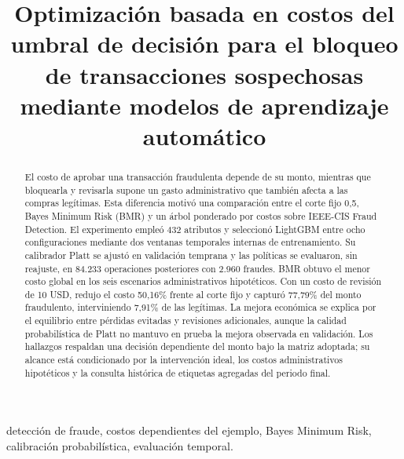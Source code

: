 \documentclass[conference,letterpaper]{IEEEtran}
\begin{document}
\renewcommand{\thesubsection}{\Alph{subsection}}
\renewcommand{\IEEEkeywordsname}{Palabras clave}
\title{Optimización basada en costos del umbral de decisión para el bloqueo de transacciones sospechosas mediante modelos de aprendizaje automático}
\author{
}
\maketitle

\begin{abstract}
El costo de aprobar una transacción fraudulenta depende de su monto, mientras que bloquearla y revisarla supone un gasto administrativo que también afecta a las compras legítimas. Esta diferencia motivó una comparación entre el corte fijo 0,5, Bayes Minimum Risk (BMR) y un árbol ponderado por costos sobre IEEE-CIS Fraud Detection. El experimento empleó 432 atributos y seleccionó LightGBM entre ocho configuraciones mediante dos ventanas temporales internas de entrenamiento. Su calibrador Platt se ajustó en validación temprana y las políticas se evaluaron, sin reajuste, en 84.233 operaciones posteriores con 2.960 fraudes. BMR obtuvo el menor costo global en los seis escenarios administrativos hipotéticos. Con un costo de revisión de 10 USD, redujo el costo 50,16\% frente al corte fijo y capturó 77,79\% del monto fraudulento, interviniendo 7,91\% de las legítimas. La mejora económica se explica por el equilibrio entre pérdidas evitadas y revisiones adicionales, aunque la calidad probabilística de Platt no mantuvo en prueba la mejora observada en validación. Los hallazgos respaldan una decisión dependiente del monto bajo la matriz adoptada; su alcance está condicionado por la intervención ideal, los costos administrativos hipotéticos y la consulta histórica de etiquetas agregadas del periodo final.
\end{abstract}
\begin{IEEEkeywords}
detección de fraude, costos dependientes del ejemplo, Bayes Minimum Risk, calibración probabilística, evaluación temporal.
\end{IEEEkeywords}
\end{document}
